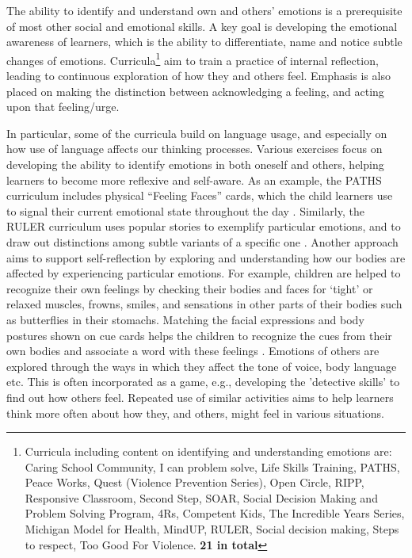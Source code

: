 \documentclass[prodmode,acmtochi]{acmsmall}
\newcommand{\GeraldineFIX}[1]{}
\begin{document}
The ability to identify and understand own and others' emotions is a prerequisite of most other social and emotional skills. A key goal is developing the emotional awareness of learners, which is the ability to differentiate, name and notice subtle changes of emotions. Curricula\footnote{Curricula including content on identifying and understanding emotions are: Caring School Community, I can problem solve, Life Skills Training, PATHS, Peace Works, Quest (Violence Prevention Series), Open Circle, RIPP, Responsive Classroom, Second Step, SOAR, Social Decision Making and Problem Solving Program, 4Rs, Competent Kids, The Incredible Years Series, Michigan Model for Health, MindUP, RULER, Social decision making, Steps to respect, Too Good For Violence. {\bf 21 in total}} aim to train a practice of internal reflection, leading to continuous exploration of how they and others feel. Emphasis is also placed on making the distinction between acknowledging a feeling, and acting upon that feeling/urge. 
\GeraldineFIX{G: all the other subsections list the relevant curricula at the beginning of the section so maybe move the footnote with the list from end of section to here}

In particular, some of the curricula build on language usage, and especially on how use of language affects our thinking processes. Various exercises focus on developing the ability to identify emotions in both oneself and others, helping learners to become more reflexive and self-aware. As an example, the PATHS curriculum  includes physical ``Feeling Faces'' cards, which the child learners use to signal their current emotional state throughout the day \cite{Kam2004,Domitrovich2007}. Similarly,  the RULER curriculum uses popular stories to exemplify particular emotions, and to draw out distinctions among subtle variants of a specific one \cite{Reyes2012}. 
%
Another approach aims to support self-reflection by exploring and understanding how our bodies are affected by experiencing particular emotions. For example, children are helped to recognize their own feelings by checking their bodies and faces for `tight' or relaxed muscles, frowns, smiles, and sensations in other parts of their bodies such as butterflies in their stomachs. Matching the facial expressions and body postures shown on cue cards helps the children to recognize the cues from their own bodies and associate a word with these feelings \cite{Webster-Stratton2004}. 
%               
Emotions of others are explored through the ways in which they affect the tone of voice, body language etc. This is often incorporated as a game, e.g., developing the 'detective skills' to find out how others feel. Repeated   use of similar activities aims to help learners think more often about how they, and others, might feel in various situations. 
\GeraldineFIX{G: do you really mean constant ie no break???}
\end{document}
